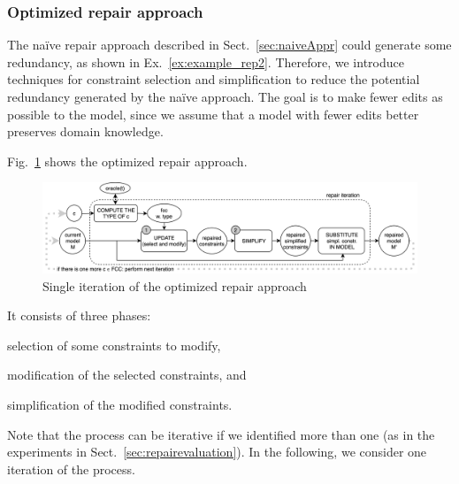 \begin{tikzborder}{\cite{Gargantini16:validation}}
\begin{tikzborder}{\cite{gargantini_combinatorial_2017}}
\begin{tikzborder}{\cite{garn2019}}
\begin{tikzborder}{\cite{arcaini2019achieving}}
\begin{tikzborder}{\cite{arcaini2019varivolution}}
		\subsubsection{Optimized repair approach}\label{sec:optimizedApproach}
		
		\bb The na{\"i}ve repair approach described in Sect.~\ref{sec:naiveAppr} could generate some redundancy, as shown in Ex.~\ref{ex:example_rep2}. Therefore, we introduce techniques for constraint selection and simplification to reduce the potential redundancy generated by the na{\"i}ve approach. The goal is to make fewer edits as possible to the model, since we assume that a model with fewer edits better preserves domain knowledge.
		
		Fig.~\ref{fig:repair_process} shows the optimized repair approach.\be
		\begin{figure}[!ht]
			\centering
			\includegraphics[width=1\textwidth]{images/repair_process_new.png}
			\caption{Single iteration of the optimized repair approach}
			\label{fig:repair_process}
		\end{figure}
		
		\bb It consists of three phases:
		\begin{inparaenum}[(1)]
			\item \textsf{selection} of some constraints to modify,
			\item \textsf{modification} of the selected constraints, and
			\item \textsf{simplification} of the modified constraints.
		\end{inparaenum}
		Note that the process can be iterative if we identified more than one \fcc (as in the experiments in Sect.~\ref{sec:repairevaluation}). In the following, we consider one iteration of the process.\be
		

\end{tikzborder}
\end{tikzborder}
\end{tikzborder}
\end{tikzborder}
\end{tikzborder}
